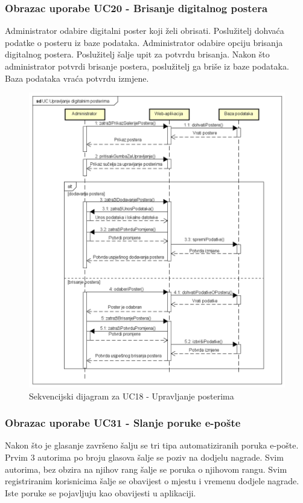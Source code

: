 				\subsubsection{Obrazac uporabe UC20 - Brisanje digitalnog postera}
				Administrator odabire digitalni poster koji želi obrisati. Poslužitelj dohvaća podatke o posteru iz baze podataka. Administrator odabire opciju brisanja digitalnog postera. Poslužitelj šalje upit za potvrdu brisanja. Nakon što administrator potvrdi brisanje postera, poslužitelj ga briše iz baze podataka. Baza podataka vraća potvrdu izmjene. 
				
				\newpage
				
				\begin{figure}[hp!]
					\includegraphics[width=\linewidth]{Slike/SD_UpravljanjePosterima.png}
					\caption{Sekvencijski dijagram za UC18 - Upravljanje posterima}
				\end{figure}
				
				\newpage
				
				\subsubsection{Obrazac uporabe UC31 - Slanje poruke e-pošte}
				Nakon što je glasanje završeno šalju se tri tipa automatiziranih poruka e-pošte. Prvim 3 autorima po broju glasova šalje se poziv na dodjelu nagrade. Svim autorima, bez obzira na njihov rang šalje se poruka o njihovom rangu. Svim registriranim korisnicima šalje se obavijest o mjestu i vremenu dodjele nagrade. Iste poruke se pojavljuju kao obavijesti u aplikaciji.
				
